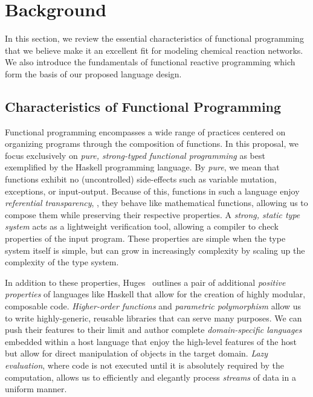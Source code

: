 
\section{Background}
\label{sec:frp_background}

In this section, we review the essential characteristics of functional programming that we believe make it an excellent fit for modeling chemical reaction networks.
We also introduce the fundamentals of functional reactive programming which form the basis of our proposed language design.

\subsection{Characteristics of Functional Programming}

Functional programming encompasses a wide range of practices centered on organizing programs through the composition of functions.
In this proposal, we focus exclusively on \emph{pure, strong-typed functional programming} as best exemplified by the Haskell programming language.
By \emph{pure}, we mean that functions exhibit no (uncontrolled) side-effects such as variable mutation, exceptions, or input-output.
Because of this, functions in such a language enjoy \emph{referential transparency}, \ie, they behave like mathematical functions, allowing us to compose them while preserving their respective properties.
A \emph{strong, static type system} acts as a lightweight verification tool, allowing a compiler to check properties of the input program.
These properties are simple when the type system itself is simple, but can grow in increasingly complexity by scaling up the complexity of the type system.

In addition to these properties, Huges~\cite{huges:1990} outlines a pair of additional \emph{positive properties} of languages like Haskell that allow for the creation of highly modular, composable code.
\emph{Higher-order functions} and \emph{parametric polymorphism} allow us to write highly-generic, reusable libraries that can serve many purposes.
We can push their features to their limit and author complete \emph{domain-specific languages} embedded within a host language that enjoy the high-level features of the host but allow for direct manipulation of objects in the target domain.
\emph{Lazy evaluation}, where code is not executed until it is absolutely required by the computation, allows us to efficiently and elegantly process \emph{streams} of data in a uniform manner.

